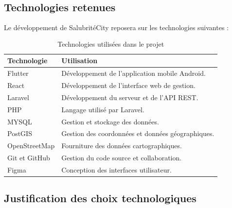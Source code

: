 \documentclass[11pt,a4paper,oneside]{report}
\begin{document}
	\subsection{Technologies retenues}
	
	Le développement de SalubritéCity reposera sur les technologies
	suivantes :
	
	\begin{table}[H]
		\centering
		\small
		\renewcommand{\arraystretch}{1.2}
		\begin{tabular}{|p{3.5cm}|p{9.8cm}|}
			\hline
			\textbf{Technologie} & \textbf{Utilisation} \\
			\hline
			Flutter & Développement de l'application mobile Android. \\
			\hline
			React & Développement de l'interface web de gestion. \\
			\hline
			Laravel & Développement du serveur et de l'API REST. \\
			\hline
			PHP & Langage utilisé par Laravel. \\
			\hline
			MYSQL & Gestion et stockage des données. \\
			\hline
			PostGIS & Gestion des coordonnées et données géographiques. \\
			\hline
			OpenStreetMap & Fourniture des données cartographiques. \\
			\hline
			Git et GitHub & Gestion du code source et collaboration. \\
			\hline
			Figma & Conception des interfaces utilisateur. \\
			\hline
		\end{tabular}
		\caption{Technologies utilisées dans le projet}
	\end{table}
	
	\subsection{Justification des choix technologiques}
	
\end{document}
